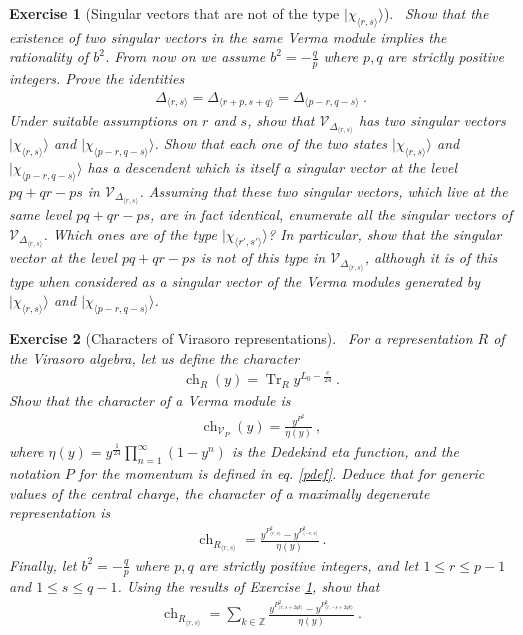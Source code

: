 \documentclass[12pt, a4paper, notitlepage, twoside]{report}
\numberwithin{equation}{section}
\theoremstyle{break}
\newtheorem{exo}{Exercise}[chapter]
\begin{document}
\begin{exo}[Singular vectors that are not of the type $|\chi_{\langle r,s \rangle}\rangle$]
 ~\label{exosv}
Show that the existence of two singular vectors in the same Verma module implies the rationality of $b^2$. 
From now on we assume $b^2=-\frac{q}{p}$ where $p,q$ are strictly positive integers.
Prove the identities 
\begin{align}
 \Delta_{\langle r,s \rangle}=\Delta_{\langle r+p,s+q \rangle}=\Delta_{\langle p-r,q-s \rangle}\ .
\end{align}
Under suitable assumptions on $r$ and $s$, show that $\mathcal{V}_{\Delta_{\langle r,s \rangle}}$ has two singular vectors $|\chi_{\langle r,s \rangle}\rangle$ and $|\chi_{\langle p-r,q-s \rangle}\rangle$.
Show that each one of the two states  $|\chi_{\langle r,s \rangle}\rangle$ and $|\chi_{\langle p-r,q-s \rangle}\rangle$ has a descendent which is itself a singular vector at the level $pq+qr-ps$ in $\mathcal{V}_{\Delta_{\langle r,s \rangle}}$.
Assuming that these two singular vectors, which live at the same level $pq+qr-ps$, are in fact identical, enumerate all the singular vectors of $\mathcal{V}_{\Delta_{\langle r,s \rangle}}$.
Which ones are of the type $|\chi_{\langle r',s' \rangle}\rangle$? In particular, show that the singular vector at the level $pq+qr-ps$ is not of this type in $\mathcal{V}_{\Delta_{\langle r,s \rangle}}$, although it is of this type when considered as a singular vector of the Verma modules generated by $|\chi_{\langle r,s \rangle}\rangle$ and $|\chi_{\langle p-r,q-s \rangle}\rangle$.
\end{exo}

\begin{exo}[Characters of Virasoro representations]
 ~\label{exochar}
For a representation $R$ of the Virasoro algebra, let us define the character 
\begin{align}
 \operatorname{ch}_R(y) = \operatorname{Tr}_R y^{L_0-\frac{c}{24}}\ .
\end{align}
Show that the character of a Verma module is 
\begin{align}
 \operatorname{ch}_{\mathcal{V}_P}(y) = \frac{y^{P^2}}{\eta(y)}\ ,
\end{align}
where $\eta(y) = y^{\frac{1}{24}}\prod_{n=1}^\infty(1-y^n)$ is the Dedekind eta function, and the notation $P$ for the momentum is defined in eq. \eqref{pdef}. 
Deduce that for generic values of the central charge, the character of a maximally degenerate representation is 
\begin{align}
 \operatorname{ch}_{R_{\langle r,s\rangle}} = \frac{y^{P^2_{\langle r,s\rangle}} - y^{P^2_{\langle -r,s\rangle}}}{\eta(y)}\ .
\end{align}
Finally, let $b^2=-\frac{q}{p}$ where $p,q$ are strictly positive integers, and let $1\leq r\leq p-1$ and $1\leq s\leq q-1$. Using the results of Exercise \ref{exosv}, show that 
\begin{align}
 \operatorname{ch}_{R_{\langle r,s\rangle}} = 
 \sum_{k\in\mathbb{Z}} \frac{y^{P^2_{\langle r, s+2qk\rangle}} - y^{P^2_{\langle r, -s+2qk\rangle}}}{\eta(y)}\ .
\end{align}
\end{exo}
\end{document}
